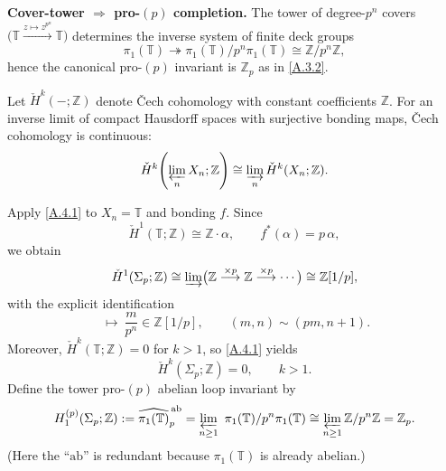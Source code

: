 \documentclass[11pt]{article}
\theoremstyle{remark}
\begin{document}
\textbf{Cover-tower $\Rightarrow$ pro-$(p)$ completion.}
The tower of degree-$p^{n}$ covers $\bigl(\mathbb T\overset{z\mapsto z^{p^{n}}}{\longrightarrow}\mathbb T\bigr)$ determines the inverse system of finite deck groups
\begin{equation}
\pi_{1}(\mathbb T)\twoheadrightarrow \pi_{1}(\mathbb T)/p^{n}\pi_{1}(\mathbb T)\cong \mathbb Z/p^{n}\mathbb Z,
\label{A.3.3}
\end{equation}
hence the canonical pro-$(p)$ invariant is $\mathbb Z_{p}$ as in \eqref{A.3.2}.

Let $\check{H}^{k}(-;\mathbb Z)$ denote \v{C}ech cohomology with constant coefficients $\mathbb Z$. For an inverse limit of compact Hausdorff spaces with surjective bonding maps, \v{C}ech cohomology is continuous:
\begin{equation}
\check{H}^{k}\!\left(\varprojlim_{n} X_{n};\mathbb Z\right)\cong\varinjlim_{n}\check{H}^{k}(X_{n};\mathbb Z).
\label{A.4.1}
\end{equation}

Apply \eqref{A.4.1} to $X_{n}=\mathbb T$ and bonding $f$. Since
\begin{equation}
\check{H}^{1}(\mathbb T;\mathbb Z)\cong \mathbb Z\cdot \alpha,
\qquad
f^{*}(\alpha)=p\,\alpha,
\label{A.4.2}
\end{equation}
we obtain
\begin{equation}
\check{H}^{1}(\Sigma_{p};\mathbb Z)
\cong
\varinjlim\bigl(\mathbb Z\overset{\times p}{\longrightarrow}\mathbb Z\overset{\times p}{\longrightarrow}\cdots\bigr)
\cong
\mathbb Z[1/p],
\label{A.4.3}
\end{equation}
with the explicit identification
\begin{equation}
[(m,n)]\ \longmapsto\ \frac{m}{p^{n}}\in \mathbb Z[1/p],
\qquad
(m,n)\sim (pm,n+1).
\label{A.4.4}
\end{equation}
Moreover, $\check{H}^{k}(\mathbb T;\mathbb Z)=0$ for $k>1$, so \eqref{A.4.1} yields
\begin{equation}
\check{H}^{k}(\Sigma_{p};\mathbb Z)=0,\qquad k>1.
\label{A.4.5}
\end{equation}
Define the tower pro-$(p)$ abelian loop invariant by
\begin{equation}
H^{(p)}_{1}(\Sigma_{p};\mathbb Z)
:=\widehat{\pi_{1}(\mathbb T)}_{p}^{\,\mathrm{ab}}
=
\varprojlim_{n\ge 1}\ \pi_{1}(\mathbb T)/p^{n}\pi_{1}(\mathbb T)
\cong
\varprojlim_{n\ge 1}\mathbb Z/p^{n}\mathbb Z
=
\mathbb Z_{p}.
\label{A.5.1}
\end{equation}
(Here the ``$\mathrm{ab}$'' is redundant because $\pi_{1}(\mathbb T)$ is already abelian.)
\end{document}
